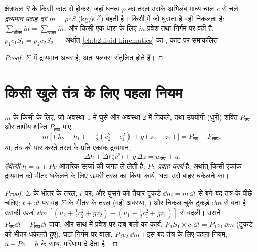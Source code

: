\begin{proposition}[द्रव्यमान संतुलन]\label{prop:b2:open-systems:mass}
क्षेत्रफल $S$ के किसी काट से होकर, जहाँ घनत्व $\rho$ का तरल उसके अभिलंब
माध्य चाल $c$ से चले, \emph{द्रव्यमान प्रवाह
दर} $\dot m = \rho c S$ (\unit{kg/s} में) बहती है। किसी
 में जो घुसता है वही निकलता है: $\sum_{\text{भीतर}}\dot m = \sum_{\text{बाहर}}
\dot m$; और किसी एक धारा के लिए $\dot m$ प्रवेश तथा निर्गम पर वही है,
$\rho_1c_1S_1 = \rho_2c_2S_2$ --- अर्थात् \cref{ch:b2:fluid-kinematics} का
, काट पर समाकलित।
\end{proposition}

\begin{proof}
$\Sigma$ में द्रव्यमान अचर है, अतः फ्लक्स संतुलित होते हैं।
\end{proof}

\section{किसी खुले तंत्र के लिए पहला नियम}

\begin{theorem}[किसी स्थायी एक-धारा प्रवाह का ऊर्जा संतुलन]\label{thm:b2:open-systems:firstlaw}
 $\dot m$ के किसी  के लिए, जो अवस्था 1 में
घुसे और अवस्था 2 में निकले, तथा उपयोगी (धुरी) शक्ति
$P_{\text{उप}}$ और तापीय शक्ति $P_{\text{ताप}}$ पाए,
\[
\dot m\,\Big[(h_2 - h_1) + \tfrac12(c_2^2 - c_1^2) + g(z_2 - z_1)\Big]
= P_{\text{उप}} + P_{\text{ताप}} ,
\]
या, तंत्र को पार करते तरल के प्रति एकांक द्रव्यमान,
\[
\Delta h + \Delta\big(\tfrac12c^2\big) + g\,\Delta z = w_{\text{उप}} + q .
\]
\emph{एंथैल्पी} $h = u + Pv$ आंतरिक ऊर्जा
की जगह ले लेती है: $Pv$ \emph{प्रवाह कार्य} है, अर्थात् किसी एकांक द्रव्यमान
को भीतर धकेलने के लिए ऊपरी तरल का किया कार्य, घटा उसे बाहर धकेलने का।
\end{theorem}

\begin{proof}
$\Sigma$ के भीतर के तरल, $t$ पर, और घुसने को तैयार टुकड़े $\dd m = \dot m\,\dd t$
से बने बंद तंत्र के पीछे चलिए; $t + \dd t$ पर वह
$\Sigma$ के भीतर के तरल (वही अवस्था, ) और निकल चुके टुकड़े $\dd m$
से बना है। उसकी ऊर्जा
$\dd m\,[(u_2 + \tfrac12c_2^2 + gz_2) - (u_1 + \tfrac12c_1^2 + gz_1)]$ से बदली। उसने
$P_{\text{उप}}\dd t + P_{\text{ताप}}\dd t$ पाया, और साथ में प्रवेश पर दाब-बलों का
कार्य, $P_1S_1 \times c_1\dd t = P_1v_1\,\dd m$
(टुकड़े को भीतर धकेलते हुए), घटा निर्गम पर वाला, $P_2v_2\,\dd m$। इस बंद
तंत्र के लिए पहला नियम, $u + Pv = h$ के साथ, परिणाम दे देता है।
\end{proof}

